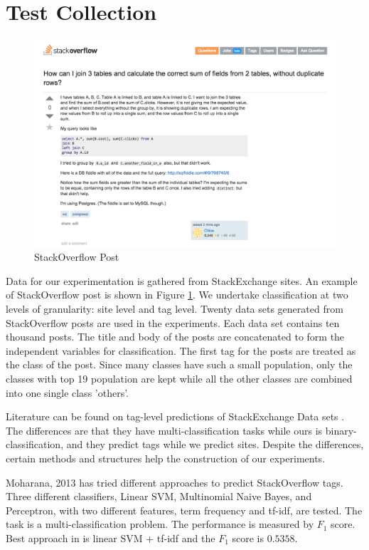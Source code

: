 \documentclass{sig-alternate-05-2015}
\begin{document}
\section{Test Collection}

\begin{figure}[t]
  \includegraphics[width=\linewidth]{./fig/example.png}
  \caption{StackOverflow Post}
  \label{fig:example}
\end{figure}

Data for our experimentation is gathered from StackExchange sites. An example of StackOverflow post is shown in Figure \ref{fig:example}. We undertake classification at two levels of granularity: site level and tag level. Twenty data sets generated from StackOverflow posts are used in the experiments. Each data set contains ten thousand posts. The title and body of the posts are concatenated to form the independent variables for classification. The first tag for the posts are treated as the class of the post. Since many classes have such a small population, only the classes with top 19 population are kept while all the other classes are combined into one single class 'others'.

Literature can be found on tag-level predictions of StackExchange Data sets \cite{moharanatag,stanley2013predicting,kuo2011word}. The differences are that they have multi-classification tasks while ours is binary-classification, and they predict tags while we predict sites. Despite the differences, certain methods and structures help the construction of our experiments.

Moharana, 2013 \cite{moharanatag} has tried different approaches to predict StackOverflow tags. Three different classifiers, Linear SVM, Multinomial Naive Bayes, and Perceptron, with two different features, term frequency and tf-idf, are tested. The task is a multi-classification problem. The performance is measured by $F_{1}$ score. Best approach in \cite{moharanatag} is linear SVM + tf-idf and the $F_{1}$ score is $0.5358$.
\end{document}
